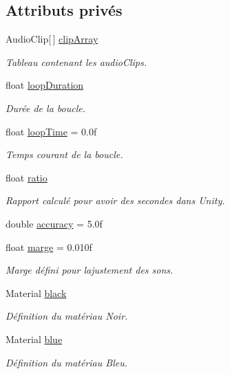 \subsection*{Attributs privés}
\begin{DoxyCompactItemize}
\item 
Audio\+Clip\mbox{[}$\,$\mbox{]} \hyperlink{class_loop_a1dfc5163d00ce897737c2a9bb95d72c3}{clip\+Array}
\begin{DoxyCompactList}\small\item\em Tableau contenant les audio\+Clips. \end{DoxyCompactList}\item 
float \hyperlink{class_loop_a5b85a1c3af3975aab929058d084929f0}{loop\+Duration}
\begin{DoxyCompactList}\small\item\em Durée de la boucle. \end{DoxyCompactList}\item 
float \hyperlink{class_loop_ab6f3df1dceea6e92a1728d8ad3558f4b}{loop\+Time} = 0.\+0f
\begin{DoxyCompactList}\small\item\em Temps courant de la boucle. \end{DoxyCompactList}\item 
float \hyperlink{class_loop_a483ac8b940665a7661559d82b9f8b3e5}{ratio}
\begin{DoxyCompactList}\small\item\em Rapport calculé pour avoir des secondes dans Unity. \end{DoxyCompactList}\item 
double \hyperlink{class_loop_a1e9897b50db8948891a1af99c7f354ca}{accuracy} = 5.\+0f
\item 
float \hyperlink{class_loop_a0db6a9a6439342876ec7eee9acf3a4bd}{marge} = 0.\+010f
\begin{DoxyCompactList}\small\item\em Marge défini pour l\textquotesingle{}ajustement des sons. \end{DoxyCompactList}\item 
Material \hyperlink{class_loop_ad2d1665b1488b64a26f42ed2ab7dc83a}{black}
\begin{DoxyCompactList}\small\item\em Définition du matériau Noir. \end{DoxyCompactList}\item 
Material \hyperlink{class_loop_abdff42bcd7fd2129d096263de28962ba}{blue}
\begin{DoxyCompactList}\small\item\em Définition du matériau Bleu. \end{DoxyCompactList}\item 

\end{DoxyCompactItemize}
